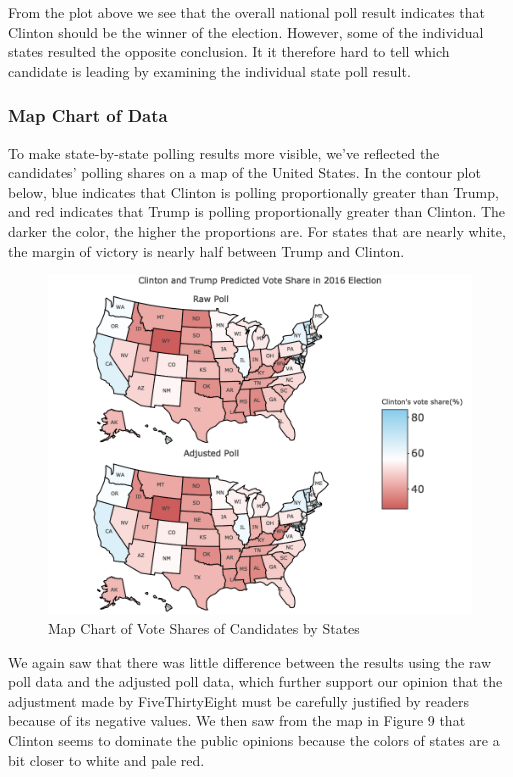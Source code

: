 \documentclass[
  12pt,
]{article}
\begin{document}
From the plot above we see that the overall national poll result
indicates that Clinton should be the winner of the election. However,
some of the individual states resulted the opposite conclusion. It it
therefore hard to tell which candidate is leading by examining the
individual state poll result.

\hypertarget{map-chart-of-data}{%
\subsubsection{Map Chart of Data}\label{map-chart-of-data}}

To make state-by-state polling results more visible, we've reflected the
candidates' polling shares on a map of the United States. In the contour
plot below, blue indicates that Clinton is polling proportionally
greater than Trump, and red indicates that Trump is polling
proportionally greater than Clinton. The darker the color, the higher
the proportions are. For states that are nearly white, the margin of
victory is nearly half between Trump and Clinton.

\begin{figure}
\centering
\includegraphics{./Figures/mapchart_1_2.png}
\caption{Map Chart of Vote Shares of Candidates by States}
\end{figure}

We again saw that there was little difference between the results using
the raw poll data and the adjusted poll data, which further support our
opinion that the adjustment made by FiveThirtyEight must be carefully
justified by readers because of its negative values. We then saw from
the map in Figure 9 that Clinton seems to dominate the public opinions
because the colors of states are a bit closer to white and pale red.
\end{document}
